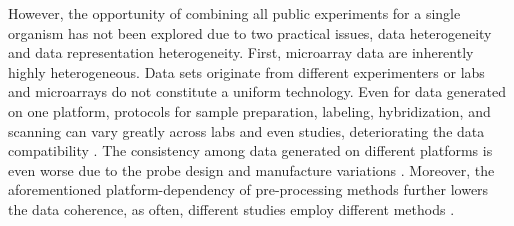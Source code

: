 %
%
However, the opportunity of combining all public experiments for a single
organism has not been explored due to two practical issues, data heterogeneity
and data representation heterogeneity.
%
First, microarray data are inherently highly heterogeneous.
%
Data sets originate from different experimenters or labs and microarrays do not
constitute a uniform technology.
%
Even for data generated on one platform, protocols for sample preparation,
labeling, hybridization, and scanning can vary greatly across labs and even
studies, deteriorating the data compatibility \cite{Bammler2005, Irizarry2005}.
%
The consistency among data generated on different platforms is even worse due to
the probe design and manufacture variations \cite{Sasik2004, Draghici2006}.
%
%
Moreover, the aforementioned platform-dependency of pre-processing methods
further lowers the data coherence, as often, different studies
employ different methods \cite{Irizarry2005, Shi2006, Stafford2007}.
%
